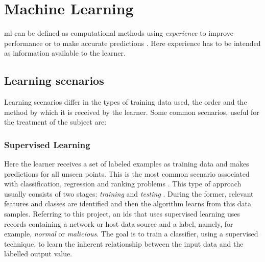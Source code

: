 
\section{Machine Learning}
\label{sec:machine-learning}


 \gls{ml} can be defined as computational methods using \textit{experience} to improve performance or to make accurate predictions \cite{Mohri2018}. Here experience has to be intended as information available to the learner.


\subsection{Learning scenarios}
\label{subsec:learning-scenarios}

Learning scenarios differ in the types of training data used, the order and the method by which it is received by the learner. Some common scenarios, useful for the treatment of the subject are:


\subsubsection{Supervised Learning}
\label{subsubsec:supervised-learning}

Here the learner receives a set of labeled examples as training data and makes predictions for all unseen points. This is the most common scenario associated with classification, regression and ranking problems \cite[p. 6]{Mohri2018}. This type of approach usually consists of two stages: \textit{training} and \textit{testing} \cite{Khraisat2019}. During the former, relevant features and classes are identified and then the algorithm learns from this data samples. Referring to this project, an \gls{ids} that uses supervised learning uses records containing a network or host data source and a label, namely, for example, \textit{normal} or \textit{malicious}. The goal is to train a classifier, using a supervised technique, to learn the inherent relationship between the input data and the labelled output value.

